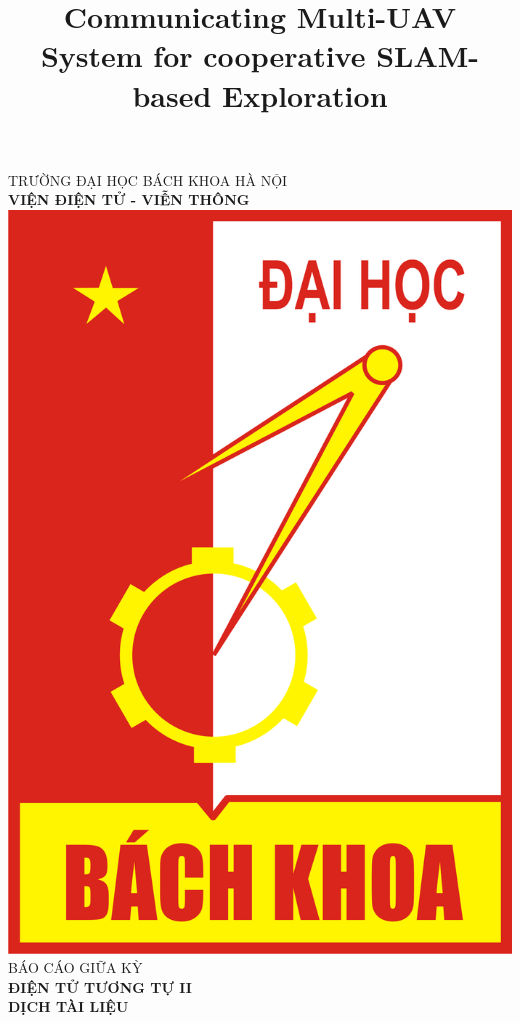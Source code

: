 \documentclass[11pt,openany]{book}
\title{Communicating Multi-UAV System for cooperative SLAM-based Exploration}
\begin{document}
\begin{titlepage}
    \begin{center}
        \small
        TRƯỜNG ĐẠI HỌC BÁCH KHOA HÀ NỘI\\
        \vspace{0.2cm}
        \LARGE
        \textbf{VIỆN ĐIỆN TỬ - VIỄN THÔNG}\\
        \vspace{1.5cm}
        \includegraphics[scale=0.3]{assets/logo.png}\\
        \vspace{1.5cm}
        \LARGE
        BÁO CÁO GIỮA KỲ\\
        \vspace{0.5cm}
        \Huge
        \textbf{ĐIỆN TỬ TƯƠNG TỰ II \\ DỊCH TÀI LIỆU}

\end{center}
\end{titlepage}
\end{document}
